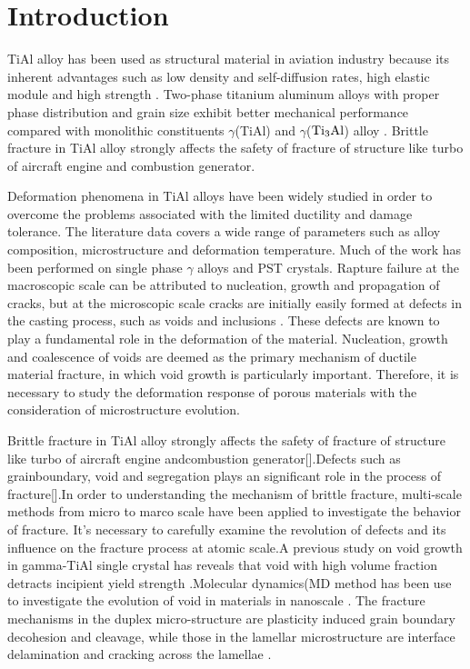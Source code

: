 \documentclass[journal,article,submit,moreauthors,pdftex,10pt,a4paper]{Definitions/mdpi}
\begin{document}
\section{Introduction}
TiAl alloy has been used as structural material in aviation industry because its inherent advantages such as low density and self-diffusion rates, high elastic module and high strength \cite{vu2013}. Two-phase titanium aluminum alloys with proper phase distribution and grain size exhibit better mechanical performance compared with monolithic constituents $\gamma$(TiAl) and $\gamma$($\rm Ti_3Al$) alloy \cite{Kim1995}. Brittle fracture in TiAl alloy strongly affects the safety of fracture of structure like turbo of aircraft engine and combustion generator. 

Deformation phenomena in TiAl alloys have been widely studied in order to overcome the problems associated with the limited ductility and damage tolerance. The literature data covers a wide range of parameters such as alloy composition, microstructure and deformation temperature. Much of the work has been performed on single phase $\gamma$ alloys and PST crystals. 
Rapture failure at the macroscopic scale can be attributed to nucleation, growth and propagation of cracks, but at the microscopic scale cracks are initially easily formed at defects in the casting process, such as voids and inclusions \cite{}. These defects are known to play a fundamental role in the deformation of the material. Nucleation, growth and coalescence of voids are deemed as the primary mechanism of ductile material fracture, in which void growth is particularly important. Therefore, it is necessary to study the deformation response of porous materials with the consideration of microstructure evolution.

Brittle fracture in TiAl alloy strongly affects the safety of fracture of structure like turbo of aircraft engine andcombustion generator[].Defects such as grainboundary, void and segregation plays an significant role in the process of fracture[].In order to understanding the mechanism of brittle fracture, multi-scale methods from micro to marco scale have been applied to investigate the behavior of fracture. It's necessary to carefully examine the revolution of defects and its influence on the fracture process at atomic scale.A previous study on void growth in gamma-TiAl single crystal has reveals that void with high volume fraction detracts incipient yield strength \cite{}.Molecular dynamics(MD method has been use to investigate the evolution of void in materials in nanoscale \cite{}. The fracture mechanisms in the duplex micro-structure are plasticity induced grain boundary decohesion and cleavage, while those in the lamellar microstructure are interface delamination and cracking across the lamellae \cite{}.
\end{document}
